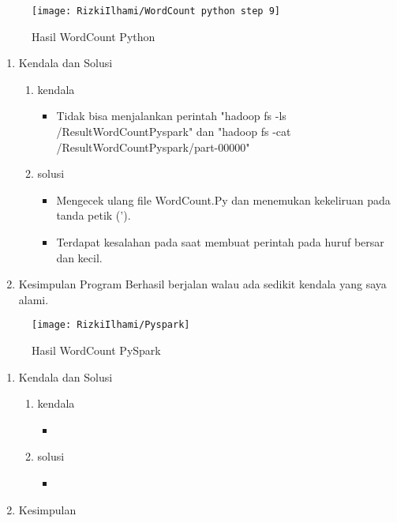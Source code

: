 \begin{figure}[!ht]
    \texttt{[image: RizkiIlhami/WordCount python step 9]}
    \caption{Hasil WordCount Python }
    \label{gam:hasil WordCountPython}
\end{figure}

\clearpage
{}
\begin{enumerate}
\item Kendala dan Solusi

\begin{enumerate}
    \item kendala
\begin{itemize}
    \item Tidak bisa menjalankan perintah 
    {\color{red}"hadoop fs -ls /ResultWordCountPyspark"} dan 
    {\color{red}"hadoop fs -cat /ResultWordCountPyspark/part-00000"}
\end{itemize}
    \item solusi
\begin{itemize}
    \item Mengecek ulang file {\color{red}WordCount.Py} dan menemukan kekeliruan pada tanda petik (').
    \item Terdapat kesalahan pada saat membuat perintah pada huruf bersar dan kecil.
\end{itemize}
\end{enumerate}

\item Kesimpulan
\newline Program Berhasil berjalan walau ada sedikit kendala yang saya alami.

\end{enumerate}

\begin{figure}[!ht]
    \texttt{[image: RizkiIlhami/Pyspark]}
    \caption{Hasil WordCount PySpark }
    \label{gam:hasil WordCountPyspark}
\end{figure}

\clearpage
{}
\begin{enumerate}
\item Kendala dan Solusi

\begin{enumerate}
    \item kendala
\begin{itemize}
    \item 
\end{itemize}
    \item solusi
\begin{itemize}
    \item 
\end{itemize}
\end{enumerate}

\item Kesimpulan

\end{enumerate}
	